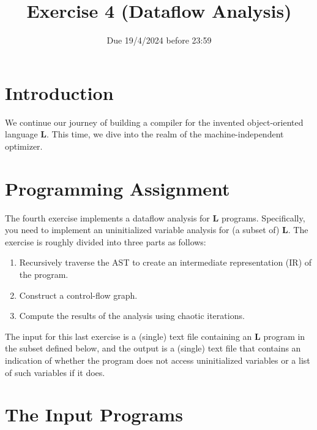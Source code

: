 \documentclass{article}
\begin{document}
\title{Exercise 4 (Dataflow Analysis)}


\date{Due 19/4/2024 before 23:59}

\maketitle

\newcommand{\plname}{\textbf{L}\xspace}

\section{Introduction}
We continue our journey of building a compiler
for the invented object-oriented language \plname.
This time, we dive into the realm of the machine-independent optimizer. 
 
\section{Programming Assignment}
The fourth exercise implements a dataflow analysis for \plname programs.
Specifically, you need to implement an uninitialized variable analysis for (a subset of) \plname.
The exercise is roughly divided into three parts as follows:
\begin{enumerate}
\item Recursively traverse the AST to create
an intermediate representation (IR) of the program.
\item Construct a control-flow graph.
\item Compute the results of the analysis using chaotic iterations.
\end{enumerate}

The input for this last exercise is a (single) text file containing an \plname
program in the subset defined below,
and the output is a (single) text file that contains an indication of whether the program does not access uninitialized variables or a list of such variables if it does.

\section{The Input Programs}
\end{document}
